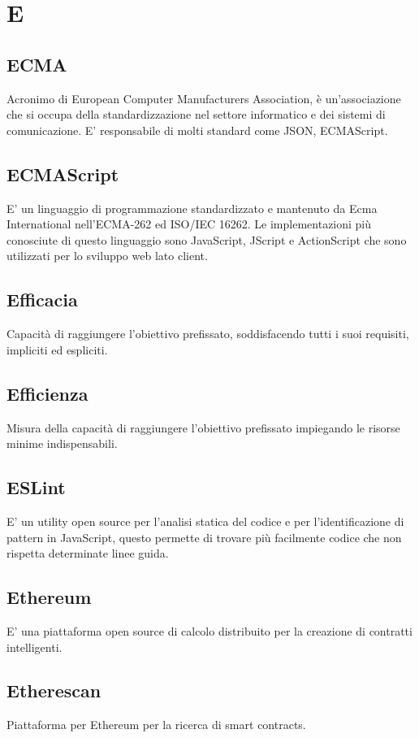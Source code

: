 \section*{E}

\subsection{ECMA}
Acronimo di European Computer Manufacturers Association, è un'associazione che si occupa della standardizzazione nel settore informatico e dei sistemi di comunicazione. E' responsabile di molti standard come JSON, ECMAScript.

\subsection{ECMAScript}
E' un linguaggio di programmazione standardizzato e mantenuto da Ecma International nell'ECMA-262 ed ISO/IEC 16262. Le implementazioni più conosciute di questo linguaggio sono JavaScript, JScript e ActionScript che sono utilizzati per lo sviluppo web lato client.

\subsection{Efficacia}
Capacità di raggiungere l'obiettivo prefissato, soddisfacendo tutti i suoi requisiti, impliciti ed espliciti.

\subsection{Efficienza}
Misura della capacità di raggiungere l'obiettivo prefissato impiegando le risorse minime indispensabili.

\subsection{ESLint}
E' un utility open source per l’analisi statica del codice e per l’identificazione di pattern in JavaScript,  questo permette di trovare più facilmente codice che non rispetta determinate linee guida.

\subsection{Ethereum}
E' una piattaforma open source di calcolo distribuito per la creazione di contratti intelligenti.

\subsection{Etherescan}
Piattaforma per Ethereum per la ricerca di smart contracts.